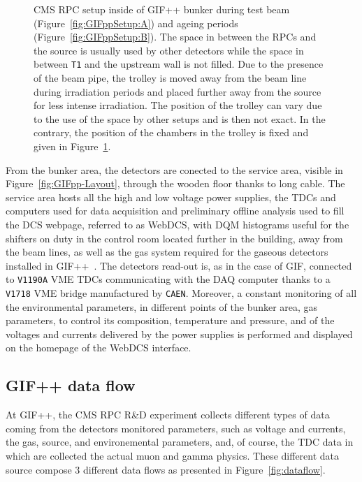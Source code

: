 \begin{figure}[H]
\begin{subfigure}{\linewidth}
        	\caption{\label{fig:GIFppSetup:C}}
    	\end{subfigure}
		\caption{\label{fig:GIFppSetup} CMS RPC setup inside of GIF++ bunker during test beam (Figure~\ref{fig:GIFppSetup:A}) and ageing periods (Figure~\ref{fig:GIFppSetup:B}). The space in between the RPCs and the source is usually used by other detectors while the space in between \texttt{T1} and the upstream wall is not filled. Due to the presence of the beam pipe, the trolley is moved away from the beam line during irradiation periods and placed further away from the source for less intense irradiation. The position of the trolley can vary due to the use of the space by other setups and is then not exact. In the contrary, the position of the chambers in the trolley is fixed and given in Figure~\ref{fig:GIFppSetup:C}.}
	\end{figure}
	
	From the bunker area, the detectors are conected to the service area, visible in Figure~\ref{fig:GIFpp-Layout}, through the wooden floor thanks to long cable. The service area hosts all the high and low voltage power supplies, the TDCs and computers used for data acquisition and preliminary offline analysis used to fill the \acf{DCS} webpage, referred to as WebDCS, with \acf{DQM} histograms useful for the shifters on duty in the control room located further in the building, away from the beam lines, as well as the gas system required for the gaseous detectors installed in GIF++~\cite{WEBDCS}. The detectors read-out is, as in the case of GIF, connected to \texttt{V1190A} VME TDCs communicating with the DAQ computer thanks to a \texttt{V1718} VME bridge manufactured by \texttt{CAEN}. Moreover, a constant monitoring of all the environmental parameters, in different points of the bunker area, gas parameters, to control its composition, temperature and pressure, and of the voltages and currents delivered by the power supplies is performed and displayed on the homepage of the WebDCS interface.

	\subsection{GIF++ data flow}
	\label{chapt5:ssec:dataflow}
	
	At GIF++, the CMS RPC R\&D experiment collects different types of data coming from the detectors monitored parameters, such as voltage and currents, the gas, source, and environemental parameters, and, of course, the TDC data in which are collected the actual muon and gamma physics. These different data source compose 3 different data flows as presented in Figure~\ref{fig:dataflow}.

